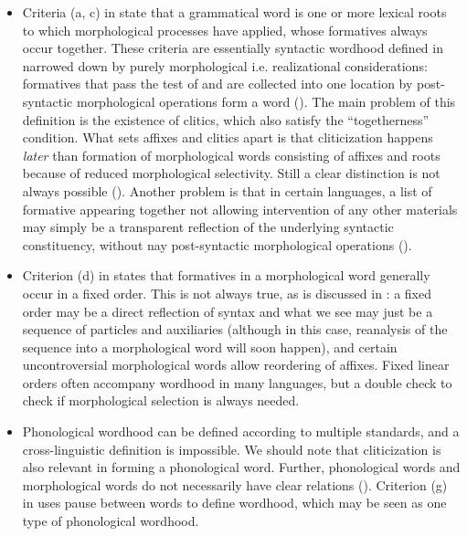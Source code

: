\documentclass[a4paper, oneside, scheme=plain, 12pt]{article}
\newcommand*{\citepage}[1]{p.~{#1}}
\newcommand*{\citepages}[1]{pp.~{#1}}
\begin{document}
\begin{itemize}
    \item Criteria (a, c) in \citet[\citepages{13-16}]{dixon2010basic2} state that 
    a grammatical word is one or more lexical roots to which morphological processes have applied,
    whose formatives always occur together.
    These criteria are essentially syntactic wordhood defined in 
    narrowed down by purely morphological i.e. realizational considerations:
    formatives that pass the test of  
    and are collected into one location by post-syntactic morphological operations
    form a word ().
    The main problem of this definition is the existence of clitics,
    which also satisfy the ``togetherness'' condition.
    What sets affixes and clitics apart is that cliticization happens \emph{later} than formation of morphological words consisting of affixes and roots
    because of reduced morphological selectivity.
    Still a clear distinction is not always possible ().
    Another problem is that in certain languages,
    a list of formative appearing together not allowing intervention of any other materials
    may simply be a transparent reflection of the underlying syntactic constituency, without nay post-syntactic morphological operations ().
    
    \item Criterion (d) in \citet[\citepage{14}]{dixon2010basic2} states that formatives in a morphological word generally occur in a fixed order.
    This is not always true, as is discussed in :
    a fixed order may be a direct reflection of syntax
    and what we see may just be a sequence of particles and auxiliaries
    (although in this case, reanalysis of the sequence into a morphological word will soon happen),
    and certain uncontroversial morphological words allow reordering of affixes.
    Fixed linear orders often accompany wordhood in many languages,
    but a double check to check if morphological selection is always needed.

    \item Phonological wordhood can be defined according to multiple standards,
    and a cross-linguistic definition is impossible.
    We should note that cliticization is also relevant in forming a phonological word.
    Further, phonological words and morphological words do not necessarily have clear relations
    ().
    Criterion (g) in \citet[\citepage{18}]{dixon2010basic2} uses pause between words to define  wordhood, which may be seen as one type of phonological wordhood.
\end{itemize}
\end{document}
